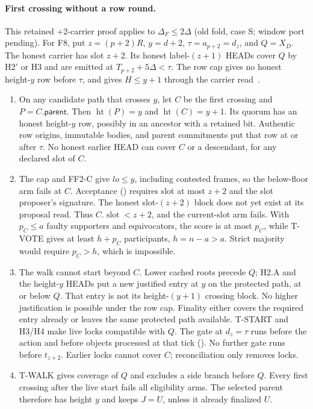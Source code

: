 \documentclass{article}
\theoremstyle{plain}
\theoremstyle{definition}
\theoremstyle{remark}
\newcommand{\slot}{\operatorname{slot}}
\newcommand{\parent}{\mathsf{parent}}
\begin{document}
\paragraph{First crossing without a row round.}\label{par:first-crossing}
This retained +2-carrier proof applies to $\Delta_F\leq2\Delta$ (old fold, case S; window port pending).
For F8, put $z=(p+2)R$, $y=d+2$, $\tau=a_{p+2}=d_z$, and $Q=X_D$.
The honest carrier has slot $z+2$.  Its honest label-$(z+1)$ HEADs
cover $Q$ by H2$'$ or H3 and are emitted at $T_{p+2}+5\Delta<\tau$.
The row cap gives no honest height-$y$ row before $\tau$, and gives
$H\leq y+1$ through the carrier read~\cite[F3, F5--F6, FF1-A]{BPF}.
\begin{enumerate}[nosep]
\item On any candidate path that crosses $y$, let $C$ be the first
  crossing and $P=C.\parent$.  Then $\operatorname{ht}(P)=y$ and
  $\operatorname{ht}(C)=y+1$.  Its quorum has an honest height-$y$ row,
  possibly in an ancestor with a retained bit.  Authentic row origins,
  immutable bodies, and parent commitments put that row at or after
  $\tau$.  No honest earlier HEAD can cover $C$ or a descendant,
  for any declared slot of $C$.
\item The cap and FF2-C give $\mathit{lo}\leq y$, including contested
  frames, so the below-floor arm fails at $C$.
  Acceptance ()
  requires slot at most $z+2$ and the slot proposer's
  signature.  The honest slot-$(z+2)$ block does not yet exist at its
  proposal read.  Thus $C.\slot<z+2$, and the current-slot arm fails.
  With $p_C\leq a$ faulty supporters and equivocators, the score is at
  most $p_C$, while T-VOTE gives at least $h+p_C$ participants,
  $h=n-a>a$.  Strict majority would require $p_C>h$, which is impossible.
\item The walk cannot start beyond $C$.  Lower cached roots precede
  $Q$; H2.A and the height-$y$ HEADs put a new justified entry at $y$
  on the protected path, at or below $Q$.  That entry is not its
  height-$(y+1)$ crossing block.  No higher justification is possible
  under the row cap.  Finality either covers the required entry already
  or leaves the same protected path available.
  T-START and H3/H4 make live locks compatible with $Q$.
  The gate at $d_z=\tau$ runs before the action and before objects
  processed at that tick ().  No further gate runs before $t_{z+2}$.
  Earlier locks cannot cover $C$; reconciliation only removes locks.
\item T-WALK gives coverage of $Q$ and excludes a side branch before
  $Q$.  Every first crossing after the live start fails all eligibility
  arms.  The selected parent therefore has height $y$ and keeps $J=U$,
  unless it already finalized $U$.
\end{enumerate}
\end{document}
